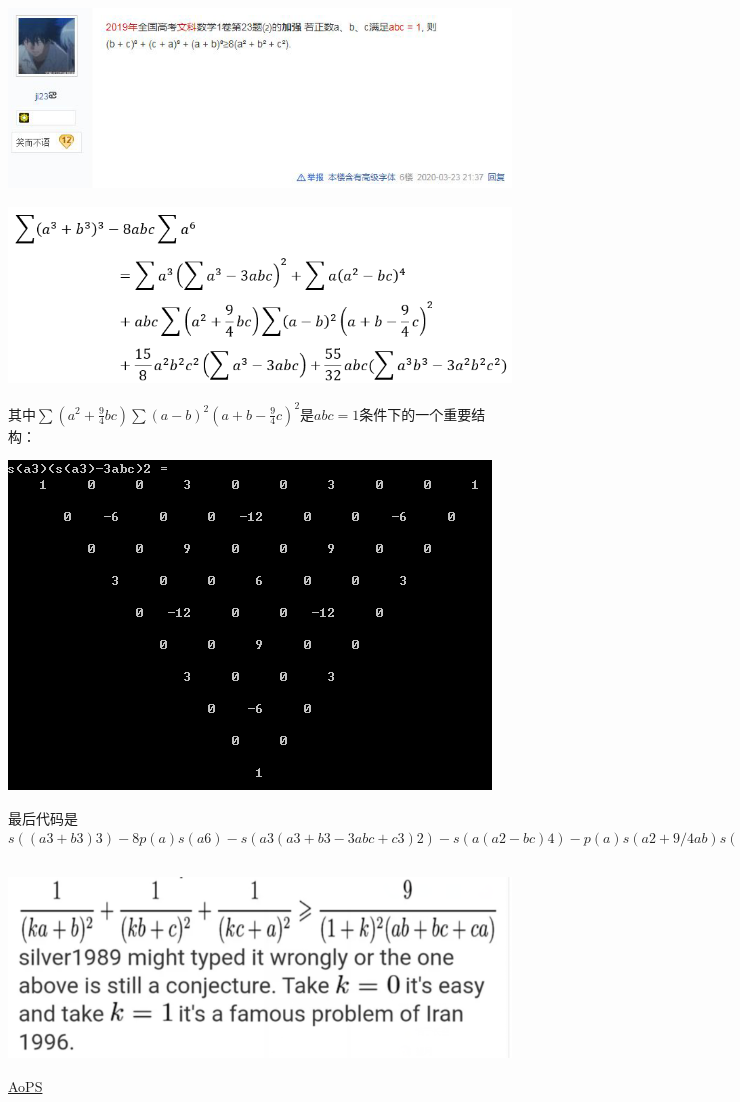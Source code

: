 \documentclass[UTF8]{ctexart}
\begin{document}
\subsection{}
\begin{center}
	\includegraphics[width=0.8\linewidth]{a22}
\end{center}
\begin{center}
	\includegraphics[width=0.8\linewidth]{a23}
\end{center}
其中$ \sum(a^{2}+\frac{9}{4} b c) \sum(a-b)^{2}(a+b-\frac{9}{4} c)^{2} $是$ abc=1 $条件下的一个重要结构：
\begin{center}
	\includegraphics[width=0.7\linewidth]{a230}
\end{center}
最后代码是
$ s((a3+b3)3)-8p(a)s(a6)-s(a3(a3+b3-3abc+c3)2)-s(a(a2-bc)4)-p(a)s(a2+9/4ab)s((a-b)2(a+b-9/4c)2)-15/8p(a2)(s(a3)-3abc)-55/32abc(s(a3b3)-3p(a2)) $
\subsection{}
\begin{center}
	\includegraphics[width=0.5\linewidth]{a24}
\end{center}
\href{https://artofproblemsolving.com/community/q1h141869p802507}{AoPS}
\end{document}
